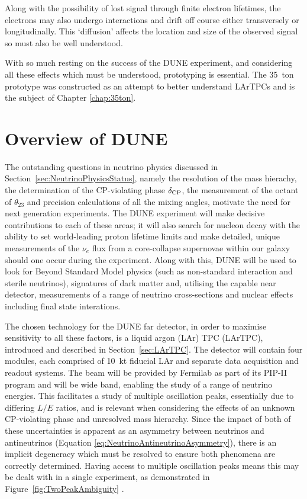 Along with the possibility of lost signal through finite electron lifetimes, the electrons may also undergo interactions and drift off course either transversely or longitudinally.  This `diffusion' affects the location and size of the observed signal so must also be well understood.

With so much resting on the success of the DUNE experiment, and considering all these effects which must be understood, prototyping is essential.  The 35~ton prototype was constructed as an attempt to better understand LArTPCs and is the subject of Chapter \ref{chap:35ton}.

\section{Overview of DUNE}\label{sec:DUNEOverview}

The outstanding questions in neutrino physics discussed in Section~\ref{sec:NeutrinoPhysicsStatus}, namely the resolution of the mass hierachy, the determination of the CP-violating phase $\delta_{\textnormal{CP}}$, the measurement of the octant of $\theta_{23}$ and precision calculations of all the mixing angles, motivate the need for next generation experiments.  The DUNE experiment will make decisive contributions to each of these areas; it will also search for nucleon decay with the ability to set world-leading proton lifetime limits and make detailed, unique measurements of the $\nu_e$ flux from a core-collapse supernovae within our galaxy should one occur during the experiment.  Along with this, DUNE will be used to look for Beyond Standard Model physics (such as non-standard interaction and sterile neutrinos), signatures of dark matter and, utilising the capable near detector, measurements of a range of neutrino cross-sections and nuclear effects including final state interations.

The chosen technology for the DUNE far detector, in order to maximise sensitivity to all these factors, is a liquid argon (LAr) TPC (LArTPC), introduced and described in Section~\ref{sec:LArTPC}.  The detector will contain four modules, each comprised of 10~kt fiducial LAr and separate data acquisition and readout systems.  The beam will be provided by Fermilab as part of its PIP-II program \cite{PIPII2013} and will be wide band, enabling the study of a range of neutrino energies.  This facilitates a study of multiple oscillation peaks, essentially due to differing $L/E$ ratios, and is relevant when considering the effects of an unknown CP-violating phase and unresolved mass hierarchy.  Since the impact of both of these uncertainties is apparent as an asymmetry between neutrinos and antineutrinos (Equation \ref{eq:NeutrinoAntineutrinoAsymmetry}), there is an implicit degeneracy which must be resolved to ensure both phenomena are correctly determined.  Having access to multiple oscillation peaks means this may be dealt with in a single experiment, as demonstrated in Figure~\ref{fig:TwoPeakAmbiguity} \cite{Huber2011}.


